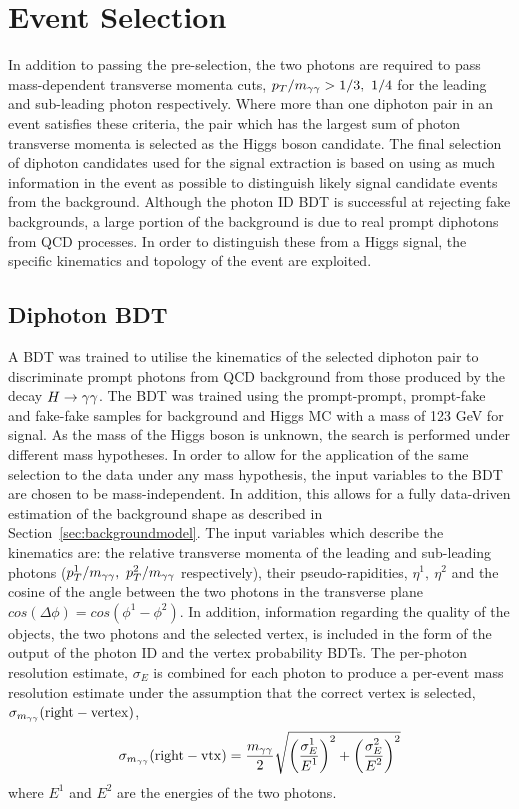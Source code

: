 \section{Event Selection}
\label{sec:eventselection}

In addition to passing the pre-selection, the two photons are required to pass mass-dependent transverse 
momenta cuts, $p_{T}/m_{\gamma\gamma} > 1/3, ~1/4$ for the leading and sub-leading photon respectively.
Where more than one diphoton pair in an event satisfies these criteria, the pair which has the largest
sum of photon transverse momenta is selected as the Higgs boson candidate.
The final selection of diphoton candidates used for the signal extraction is based on using as much information 
in the event as possible to distinguish likely signal candidate events from the background. Although the 
photon ID BDT is successful at rejecting fake backgrounds, a large portion of the background is due to
real prompt diphotons from QCD processes. In order to distinguish these from a Higgs signal, 
the specific kinematics and topology of the event are exploited.

\subsection{Diphoton BDT}
\label{sec:diphotonbdt}
A BDT was trained to utilise the kinematics of the selected diphoton pair to discriminate prompt photons
from QCD background from those produced by the decay $H\rightarrow\gamma\gamma$. The BDT was trained using the prompt-prompt, prompt-fake
and fake-fake samples for background and Higgs MC with a mass of 123 GeV for signal.
As the mass of the Higgs boson is unknown, the search is performed under different mass hypotheses.
In order to allow for the application of the same selection to the data under any mass hypothesis,
the input variables to the BDT are chosen to be mass-independent. In addition, this allows
for a fully data-driven estimation of the background shape as described in Section~\ref{sec:backgroundmodel}.
The input variables which describe the kinematics are:
the relative transverse momenta of the leading and sub-leading photons ($p_{T}^{1}/m_{\gamma\gamma},~p_{T}^{2}/m_{\gamma\gamma}$ respectively), 
their pseudo-rapidities, $\eta^{1},~\eta^{2}$ and the cosine of the 
angle between the two photons in the transverse plane $cos(\Delta\phi)=cos(\phi^{1}-\phi^{2})$.
In addition, information regarding the quality
of the objects, the two photons and the selected vertex, is included in the form of the output of the 
photon ID and the vertex probability BDTs. The per-photon resolution estimate, $\sigma_{E}$ is combined for
each photon to produce a per-event mass resolution estimate under the assumption that 
the correct vertex is selected, $\sigma_{m_{\gamma\gamma}}(\mathrm{right-vertex})$,
\begin{equation}
\sigma_{m_{\gamma\gamma}} (\mathrm{right-vtx}) = \frac{\displaystyle m_{\gamma\gamma}}{\displaystyle 2} 
\sqrt{ \left( \frac{\displaystyle {\sigma_{E}^{1}}}{\displaystyle E^{1} } \right)^{2}
     + \left( \frac{\displaystyle {\sigma_{E}^{2}}}{\displaystyle E^{2} } \right)^{2}
     }
\end{equation}
where $E^{1}$ and $E^{2}$ are the energies of the two photons.

